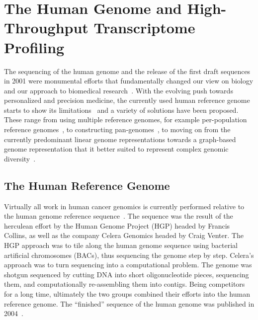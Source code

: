\documentclass[11pt]{book}
\begin{document}
\section{The Human Genome and High-Throughput Transcriptome Profiling}
\label{sec:human-genome}

The sequencing of the human genome and the release of the first draft sequences in 2001 were monumental efforts that fundamentally changed our view on biology and our approach to biomedical research~\cite{Gibbs:2020}. With the evolving push towards personalized and precision medicine, the currently used human reference genome starts to show its limitations~\cite{Rosenfeld:2012} and a variety of solutions have been proposed. These range from using multiple reference genomes, for example per-population reference genomes~\cite{Chen:2020-multiref}, to constructing pan-genomes~\cite{Yang:2019-refgenome, ShermanSalzberg:2020}, to moving on from the currently predominant linear genome representations towards a graph-based genome representation that it better suited to represent complex genomic diversity~\cite{Paten:2017}.


\subsection{The Human Reference Genome}
\label{subsec:reference-genome}

Virtually all work in human cancer genomics is currently performed relative to the human genome reference sequence~\cite{HGP:2001, Venter:2001}. The sequence was the result of the herculean effort by the Human Genome Project (HGP) headed by Francis Collins, as well as the company Celera Genomics headed by Craig Venter. The HGP approach was to tile along the human genome sequence using bacterial artificial chromosomes (BACs), thus sequencing the genome step by step. Celera's approach was to turn sequencing into a computational problem. The genome was shotgun sequenced by cutting DNA into short oligonucleotide pieces, sequencing them, and computationally re-assembling them into contigs. Being competitors for a long time, ultimately the two groups combined their efforts into the human reference genome. The ``finished'' sequence of the human genome was published in 2004~\cite{IHGSC:2004}.
\end{document}
